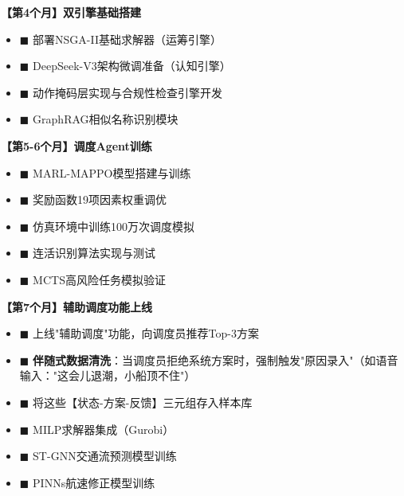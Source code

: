 \documentclass[12pt,a4paper]{article}
\begin{document}
\begin{tcolorbox}[colback=blue!5!white,colframe=blue!75!black,title=\textbf{阶段目标：引入大模型，开始积累SFT（Supervised Fine-Tuning）数据}]

\textbf{【第4个月】双引擎基础搭建}

\begin{itemize}[label={}, leftmargin=*, itemsep=3pt]
    \item \textcolor{blue!70!black}{$\blacksquare$} 部署NSGA-II基础求解器（运筹引擎）
    \item \textcolor{blue!70!black}{$\blacksquare$} DeepSeek-V3架构微调准备（认知引擎）
    \item \textcolor{blue!70!black}{$\blacksquare$} 动作掩码层实现与合规性检查引擎开发
    \item \textcolor{blue!70!black}{$\blacksquare$} GraphRAG相似名称识别模块
\end{itemize}

\textbf{【第5-6个月】调度Agent训练}

\begin{itemize}[label={}, leftmargin=*, itemsep=3pt]
    \item \textcolor{blue!70!black}{$\blacksquare$} MARL-MAPPO模型搭建与训练
    \item \textcolor{blue!70!black}{$\blacksquare$} 奖励函数19项因素权重调优
    \item \textcolor{blue!70!black}{$\blacksquare$} 仿真环境中训练100万次调度模拟
    \item \textcolor{blue!70!black}{$\blacksquare$} 连活识别算法实现与测试
    \item \textcolor{blue!70!black}{$\blacksquare$} MCTS高风险任务模拟验证
\end{itemize}

\textbf{【第7个月】辅助调度功能上线}

\begin{itemize}[label={}, leftmargin=*, itemsep=3pt]
    \item \textcolor{blue!70!black}{$\blacksquare$} 上线"辅助调度"功能，向调度员推荐Top-3方案
    \item \textcolor{blue!70!black}{$\blacksquare$} \textbf{伴随式数据清洗}：当调度员拒绝系统方案时，强制触发"原因录入"（如语音输入："这会儿退潮，小船顶不住"）
    \item \textcolor{blue!70!black}{$\blacksquare$} 将这些【状态-方案-反馈】三元组存入样本库
    \item \textcolor{blue!70!black}{$\blacksquare$} MILP求解器集成（Gurobi）
    \item \textcolor{blue!70!black}{$\blacksquare$} ST-GNN交通流预测模型训练
    \item \textcolor{blue!70!black}{$\blacksquare$} PINNs航速修正模型训练
\end{itemize}


\end{tcolorbox}
\end{document}
